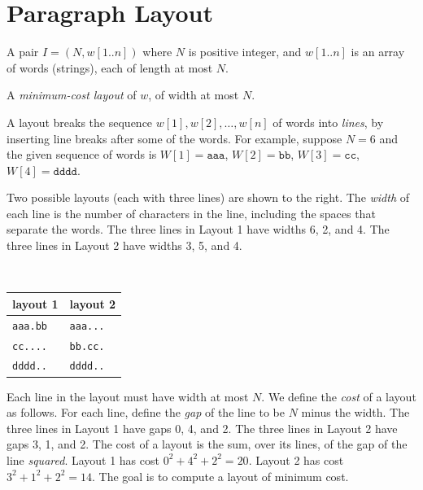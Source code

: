 

% 


\newcommand{\width}[1]{\ensuremath{\operatorname{\sf width}(#1)}}

\section{Paragraph Layout}\label{dp: sec: paragraph layout}

\begin{mylist}
\item[\bf input:]
  A pair $I=(N, w[1..n])$ where $N$ is positive integer,
  and $w[1..n]$ is an array of words (strings),
  each of length at most $N$.
  
\item[\bf output:]
  A \emph{minimum-cost layout} of $w$, of width at most $N$.
\end{mylist}

A layout breaks the sequence $w[1], w[2], \ldots, w[n]$ of words into \emph{lines},
by inserting line breaks after some of the words.
For example, suppose $N=6$ and the given sequence of words is
$W[1]=\texttt{aaa}$, $W[2]=\texttt{bb}$, $W[3]=\texttt{cc}$, $W[4]=\texttt{dddd}$.

\noindent\parbox{5in}{
  \hspace*{1em}
  Two possible layouts (each with three lines) are shown to the right.
The \emph{width} of each line is the number of characters in the line,
including the spaces that separate the words.
The three lines in Layout 1 have widths 6, 2, and 4.  
The three lines in Layout 2 have widths 3, 5, and 4.}
~~~\parbox{2in}{
\begin{tabular}{| l | l |} \hline
 layout 1 & layout 2 \\ \hline
  \tt aaa.bb  & \tt aaa... \\ 
  \tt cc.... & \tt bb.cc.\\
  \tt dddd.. & \tt dddd.. \\ \hline
\end{tabular}
}

Each line in the layout must have width at most $N$.
We define the \emph{cost} of a layout as follows.
For each line, define the \emph{gap} of the line
to be $N$ minus the width.
The three lines in Layout 1 have gaps 0, 4, and 2.  
The three lines in Layout 2 have gaps 3, 1, and 2.  
The cost of a layout is the sum,
over its lines, of the gap of the line \emph{squared}.
Layout 1 has cost $0^2+4^2+2^2 = 20$.  
Layout 2 has cost $3^2+1^2+2^2 = 14$.  
The goal is to compute a layout of minimum cost.

